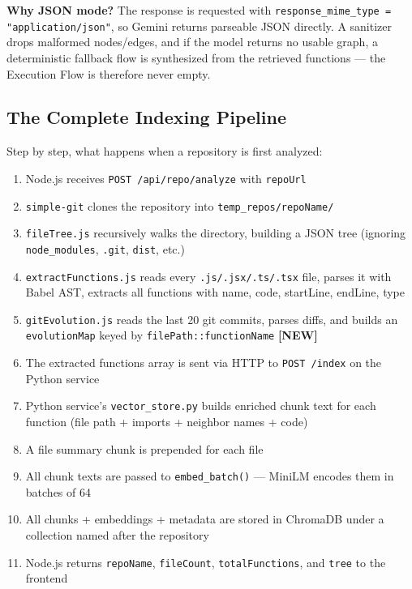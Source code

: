 \documentclass[a4paper,11pt]{article}
\begin{document}
\begin{mdframed}[style=notebox]
\textbf{Why JSON mode?} The response is requested with \texttt{response\_mime\_type = "application/json"}, so Gemini returns parseable JSON directly. A sanitizer drops malformed nodes/edges, and if the model returns no usable graph, a deterministic fallback flow is synthesized from the retrieved functions --- the Execution Flow is therefore never empty.
\end{mdframed}

\subsection{The Complete Indexing Pipeline}

Step by step, what happens when a repository is first analyzed:

\begin{enumerate}
    \item Node.js receives \texttt{POST /api/repo/analyze} with \texttt{repoUrl}
    \item \texttt{simple-git} clones the repository into \texttt{temp\_repos/repoName/}
    \item \texttt{fileTree.js} recursively walks the directory, building a JSON tree (ignoring \texttt{node\_modules}, \texttt{.git}, \texttt{dist}, etc.)
    \item \texttt{extractFunctions.js} reads every \texttt{.js/.jsx/.ts/.tsx} file, parses it with Babel AST, extracts all functions with name, code, startLine, endLine, type
    \item \texttt{gitEvolution.js} reads the last 20 git commits, parses diffs, and builds an \texttt{evolutionMap} keyed by \texttt{filePath::functionName} \textbf{[NEW]}
    \item The extracted functions array is sent via HTTP to \texttt{POST /index} on the Python service
    \item Python service's \texttt{vector\_store.py} builds enriched chunk text for each function (file path + imports + neighbor names + code)
    \item A file summary chunk is prepended for each file
    \item All chunk texts are passed to \texttt{embed\_batch()} --- MiniLM encodes them in batches of 64
    \item All chunks + embeddings + metadata are stored in ChromaDB under a collection named after the repository
    \item Node.js returns \texttt{repoName}, \texttt{fileCount}, \texttt{totalFunctions}, and \texttt{tree} to the frontend
\end{enumerate}
\end{document}
